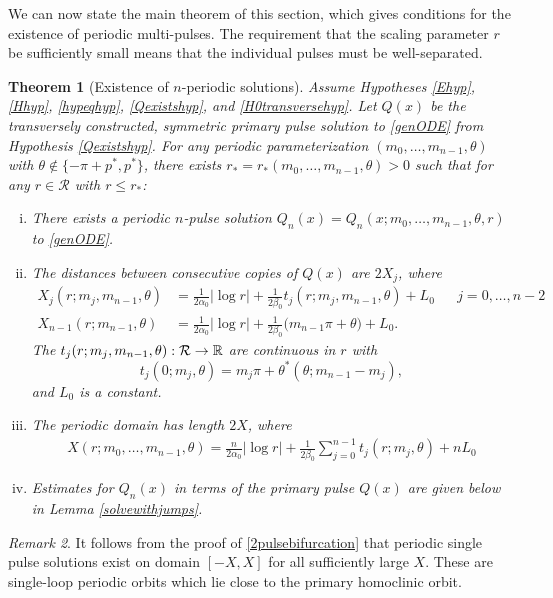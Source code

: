 \documentclass[11pt,reqno]{amsart}
\theoremstyle{plain}
\newtheorem{theorem}{Theorem}
\theoremstyle{definition}
\theoremstyle{remark}
\newtheorem{remark}[theorem]{Remark}
\begin{document}
We can now state the main theorem of this section, which gives conditions for the existence of periodic multi-pulses. The requirement that the scaling parameter $r$ be sufficiently small means that the individual pulses must be well-separated.

\begin{theorem}[Existence of $n$-periodic solutions]\label{perexist}
Assume Hypotheses \ref{Ehyp}, \ref{Hhyp}, \ref{hypeqhyp}, \ref{Qexistshyp}, and \ref{H0transversehyp}. Let $Q(x)$ be the transversely constructed, symmetric primary pulse solution to \eqref{genODE} from Hypothesis \ref{Qexistshyp}. For any periodic parameterization $(m_0, \dots, m_{n-1}, \theta)$ with $\theta \notin \{-\pi + p^*, p^* \}$, there exists $r_* = r_*(m_0, \dots, m_{n-1}, \theta) > 0$ such that for any $r \in \mathcal{R}$ with $r \leq r_*$:
\begin{enumerate}[(i)]
	\item There exists a periodic $n$-pulse solution $Q_n(x) = Q_n(x; m_0, \dots, m_{n-1}, \theta, r)$ to \eqref{genODE}.

	\item The distances between consecutive copies of $Q(x)$ are $2X_j$, where
	\begin{align}\label{Xj}
		X_j(r; m_j, m_{n-1},\theta) &= \frac{1}{2 \alpha_0} |\log r| + \frac{1}{2\beta_0} t_j(r; m_j,m_{n-1}, \theta) + L_0 && j = 0, \dots, n-2 \\
		X_{n-1}(r; m_{n-1}, \theta) &= \frac{1}{2 \alpha_0} |\log r| + \frac{1}{2 \beta_0}\big( m_{n-1}\pi + \theta \big) + L_0.
	\end{align}
	The $t_j(r; m_j, m_{n-1}, \theta): \mathcal{R} \rightarrow \mathbb{R}$ are continuous in $r$ with 
	\[
	t_j(0; m_j, \theta) = m_j \pi + \theta^*(\theta; m_{n-1} - m_j),
	\]
	and $L_0$ is a constant.

	\item The periodic domain has length $2X$, where
	\begin{align}\label{Xdomain}
	X(r; m_0, \dots, m_{n-1}, \theta) = \frac{n}{2\alpha_0} |\log r| + \frac{1}{2\beta_0} \sum_{j=0}^{n-1} t_j(r; m_j, \theta) + n L_0
	\end{align}

	\item Estimates for $Q_n(x)$ in terms of the primary pulse $Q(x)$ are given below in Lemma \ref{solvewithjumps}.
\end{enumerate}
\end{theorem}

\begin{remark}
It follows from the proof of \cref{2pulsebifurcation} that periodic single pulse solutions exist on domain $[-X, X]$ for all sufficiently large $X$. These are single-loop periodic orbits which lie close to the primary homoclinic orbit.
\end{remark}
\end{document}
